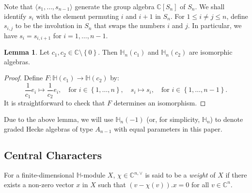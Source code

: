 \documentclass[11pt]{amsart}
\numberwithin{equation}{section}
\theoremstyle{definition}
\newtheorem{lemma}[thm]{Lemma}
\begin{document}
Note that \(\langle s_1,\ldots, s_{n-1} \rangle \) generate the group algebra \(\mathbb C[S_n]\) of \(S_n\). We shall identify \(s_i\) with the element permuting \(i\) and \(i+1\) in  \(S_n\). For \(1\leq i \neq j\leq n\), define \(s_{i,j}\) to be the involution in \(S_n\) that swaps the numbers \(i\) and \(j\). In particular, we have \(s_i=s_{i,i+1}\) for \(i=1,\ldots, n-1\).

\begin{lemma}
Let $c_1, c_2\in \mathbb C\setminus \left\{ 0 \right\}$. Then $\mathbb{H}_{n}(c_{1})$ and $\mathbb{H}_{n}(c_{2})$ are isomorphic algebras.
\end{lemma} 
\begin{proof}
Define $F: \mathbb H(c_1)\rightarrow \mathbb H(c_2)$  by:
\[   \frac{1}{c_1}e_i \mapsto \frac{1}{c_2}e_i, \quad \mbox{for $i\in \left\{1, \ldots, n\right\}$} ,\quad    s_i \mapsto s_i, \quad \mbox{for $i \in \left\{1, \ldots, n-1\right\}$}.
\]
It is straightforward to check that $F$ determines an isomorphism.
\end{proof}

Due to the above lemma, we will use $\mathbb{H}_{n}(-1)$ (or, for simplicity, $\mathbb{H}_{n}$) to denote graded Hecke algebras of type $A_{n-1}$ with equal parameters in this paper.




\subsection{Central Characters}

For a finite-dimensional $\mathbb H$-module $X$, $\chi \in \mathbb{C}^{n,\vee}$ is said to be a \emph{weight} of $X$ if there exists a non-zero vector $x$ in $X$ such that $(v-\chi(v)).x=0$ for all $v \in \mathbb{C}^{n}$.
\end{document}
